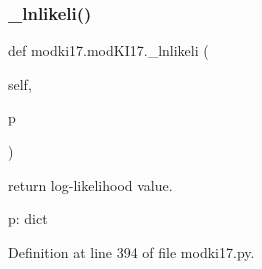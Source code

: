 \subsubsection{\texorpdfstring{\+\_\+lnlikeli()}{\_lnlikeli()}}
{\footnotesize\ttfamily def modki17.\+mod\+K\+I17.\+\_\+lnlikeli (\begin{DoxyParamCaption}\item[{}]{self,  }\item[{}]{p }\end{DoxyParamCaption})\hspace{0.3cm}{\ttfamily [private]}}

\begin{DoxyVerb}return log-likelihood value.

p: dict
\end{DoxyVerb}
 

Definition at line 394 of file modki17.\+py.


